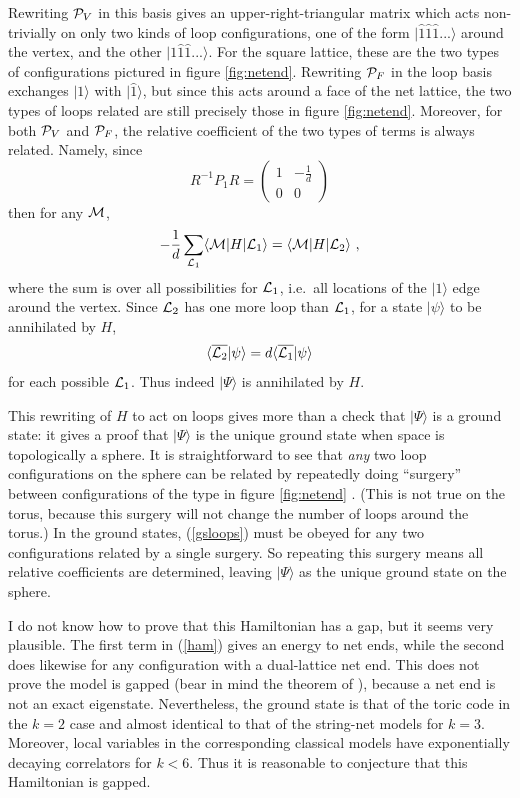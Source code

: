 \documentclass[11pt]{article}
\newcommand{\xxr}{|\widehat{1}\rangle}
\begin{document}
Rewriting ${\cal P}_V$ in this basis gives an upper-right-triangular
matrix which acts non-trivially on only two kinds of loop
configurations, one of the form
$|\widehat{1}\widehat{1}\widehat{1}...\rangle$ around the vertex, and
the other $|1\widehat{1}\widehat{1}...\rangle$. For the square
lattice, these are the two types of configurations pictured in figure
\ref{fig:netend}.  Rewriting ${\cal P}_F$ in the loop basis exchanges
$|1\rangle$ with $\xxr$, but since this acts around a face of the net
lattice, the two types of loops related are still precisely those in
figure \ref{fig:netend}.  Moreover, for both ${\cal P}_V$ and ${\cal
P}_F$, the relative coefficient of the two types of terms is always
related. Namely, since
$$R^{-1}P_1 R = 
\begin{pmatrix}
1&-\frac{1}{d}\\
0&0
\end{pmatrix}
$$
then for any ${\cal M}$,
$$
-\frac{1}{d}\sum_{{\cal L}_1}
\langle{\cal M} | H |{\cal L}_1 \rangle= 
\langle{\cal M} | H |{\cal L}_2 \rangle \ ,
$$
where the sum is over all possibilities for ${\cal L}_1$, i.e.\ all
locations of the $|1\rangle$ edge around the vertex.
Since ${\cal L}_2$ has one more loop than ${\cal L}_1$, for a state 
$|\psi\rangle$ to
be annihilated by $H$,
\begin{equation}
\langle\overline{{\cal L}_2} |\psi\rangle =  
d \langle\overline{{\cal L}_1} |\psi\rangle
\label{gsloops}
\end{equation}
for each possible ${\cal L}_1$. 
Thus indeed $|\Psi\rangle$ is annihilated by $H$. 

This rewriting of $H$ to act on loops gives more than a check that
$|\Psi\rangle$ is a ground state: it gives a proof that $|\Psi\rangle$ is the
unique ground state when space is topologically a sphere. It is
straightforward to see that {\em any} two loop configurations on the
sphere can be related by repeatedly doing ``surgery'' between
configurations of the type in figure \ref{fig:netend}
\cite{Freedman01,FNS}. (This is not true on the torus, because this
surgery will not change the number of loops around the torus.) In the
ground states, (\ref{gsloops}) must be obeyed for any two
configurations related by a single surgery. So repeating this surgery
means all relative coefficients are determined, leaving $|\Psi\rangle$
as the unique ground state on the sphere.


I do not know how to prove that this Hamiltonian has a gap, but it
seems very plausible. The first term in (\ref{ham}) gives an energy to
net ends, while the second does likewise for any configuration with a
dual-lattice net end. This does not prove the model is gapped (bear in
mind the theorem of \cite{FNS}), because a net end is not an exact
eigenstate. Nevertheless, the ground state is that of the toric code
in the $k=2$ case and almost identical to that of the string-net
models for $k=3$. Moreover, local variables in the
corresponding classical models have exponentially decaying correlators
for $k<6$. Thus it is reasonable to conjecture that this Hamiltonian
is gapped.
\end{document}
